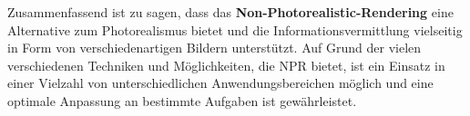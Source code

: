 Zusammenfassend ist zu sagen, dass das \textbf{Non-Photorealistic-Rendering} eine 
Alternative zum Photorealismus bietet und die Informationsvermittlung 
vielseitig in Form von verschiedenartigen Bildern unterstützt. Auf Grund der 
vielen verschiedenen Techniken und Möglichkeiten, die NPR bietet, ist ein 
Einsatz in einer Vielzahl von unterschiedlichen Anwendungsbereichen möglich und 
eine optimale Anpassung an bestimmte Aufgaben ist gewährleistet.
